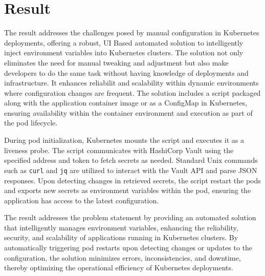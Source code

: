 \section{Result}

The result addresses the challenges posed by manual configuration in Kubernetes deployments, offering a robust, UI Based automated solution to intelligently inject environment variables into Kubernetes clusters. The solution not only eliminates the need for manual tweaking and adjustment but also make developers to do the same task without having knowledge of deployments and infrastructure. It enhances reliabilit and scalability within dynamic environments where configuration changes are frequent.
The solution includes a script packaged along with the application container image or as a ConfigMap in Kubernetes, ensuring availability within the container environment and execution as part of the pod lifecycle.

During pod initialization, Kubernetes mounts the script and executes it as a liveness probe. The script communicates with HashiCorp Vault using the specified address and token to fetch secrets as needed. Standard Unix commands such as \texttt{curl} and \texttt{jq} are utilized to interact with the Vault API and parse JSON responses. Upon detecting changes in retrieved secrets, the script restart the pods and exports new secrets as environment variables within the pod, ensuring the application has access to the latest configuration.

The result addresses the problem statement by providing an automated solution that intelligently manages environment variables, enhancing the reliability, security, and scalability of applications running in Kubernetes clusters. By automatically triggering pod restarts upon detecting changes or updates to the configuration, the solution minimizes errors, inconsistencies, and downtime, thereby optimizing the operational efficiency of Kubernetes deployments.